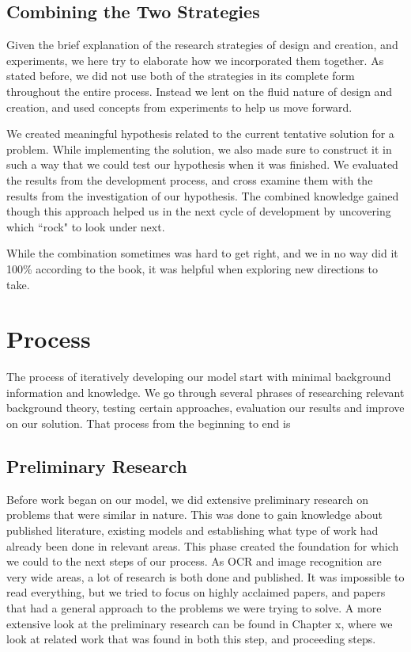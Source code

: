 \subsection{Combining the Two Strategies}
Given the brief explanation of the research strategies of design and creation, and experiments, we here try to elaborate how we incorporated them together. As stated before, we did not use both of the strategies in its complete form throughout the entire process. Instead we lent on the fluid nature of design and creation, and used concepts from experiments to help us move forward. 

We created meaningful hypothesis related to the current tentative solution for a problem. While implementing the solution, we also made sure to construct it in such a way that we could test our hypothesis when it was finished. We evaluated the results from the development process, and cross examine them with the results from the investigation of our hypothesis. The combined knowledge gained though this approach helped us in the next cycle of development by uncovering which ``rock" to look under next.

While the combination sometimes was hard to get right, and we in no way did it 100\% according to the book, it was helpful when exploring new directions to take.


\section{Process}
The process of iteratively developing our model start with minimal background information and knowledge. We go through several phrases of researching relevant background theory, testing certain approaches, evaluation our results and improve on our solution. That process from the beginning to end is 

\subsection{Preliminary Research}
Before work began on our model, we did extensive preliminary research on problems that were similar in nature. This was done to gain knowledge about published literature, existing models and establishing what type of work had already been done in relevant areas. This phase created the foundation for which we could to the next steps of our process. As OCR and image recognition are very wide areas, a lot of research is both done and published. It was impossible to read everything, but we tried to focus on highly acclaimed papers, and papers that had a general approach to the problems we were trying to solve. A more extensive look at the preliminary research can be found in Chapter x, where we look at related work that was found in both this step, and proceeding steps.

